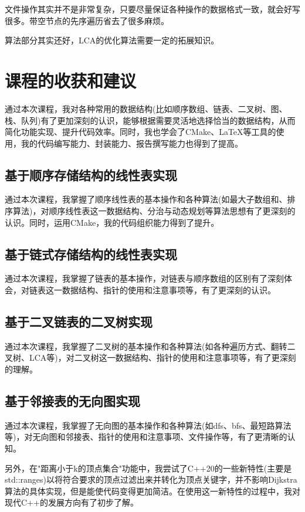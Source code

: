 \documentclass[supercite]{Experimental_Report}
\theoremstyle{definition}
\begin{document}
文件操作其实并不是非常复杂，只要尽量保证各种操作的数据格式一致，就会好写很多。带空节点的先序遍历省去了很多麻烦。

算法部分其实还好，LCA的优化算法需要一定的拓展知识。

\newpage

\section{课程的收获和建议}

通过本次课程，我对各种常用的数据结构(比如顺序数组、链表、二叉树、图、栈、队列)有了更加深刻的认识，能够根据需要灵活地选择恰当的数据结构，从而简化功能实现、提升代码效率。同时，我也学会了CMake、LaTeX等工具的使用，我的代码编写能力、封装能力、报告撰写能力也得到了提高。

\subsection{基于顺序存储结构的线性表实现}

通过本次课程，我掌握了顺序线性表的基本操作和各种算法(如最大子数组和、排序算法)，对顺序线性表这一数据结构、分治与动态规划等算法思想有了更深刻的认识。同时，运用CMake，我的代码组织能力得到了提升。

\subsection{基于链式存储结构的线性表实现}

通过本次课程，我掌握了链表的基本操作，对链表与顺序数组的区别有了深刻体会，对链表这一数据结构、指针的使用和注意事项等，有了更深刻的认识。

\subsection{基于二叉链表的二叉树实现}

通过本次课程，我掌握了二叉树的基本操作和各种算法(如各种遍历方式、翻转二叉树、LCA等)，对二叉树这一数据结构、指针的使用和注意事项等，有了更深刻的理解。

\subsection{基于邻接表的无向图实现}

通过本次课程，我掌握了无向图的基本操作和各种算法(如dfs、bfs、最短路算法等)，对无向图和邻接表、指针的使用和注意事项、文件操作等，有了更清晰的认知。

另外，在"距离小于k的顶点集合"功能中，我尝试了C++20的一些新特性(主要是std::ranges)以将符合要求的顶点过滤出来并转化为顶点关键字，并不影响Dijkstra算法的具体实现，但是能使代码变得更加简洁。在使用这一新特性的过程中，我对现代C++的发展方向有了初步了解。
\end{document}
